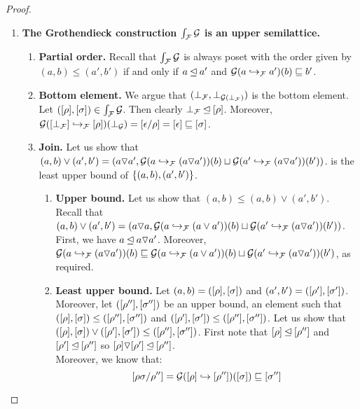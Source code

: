 \begin{proof}
\begin{enumerate}
\item {\bf The Grothendieck construction $\grothy{\ulbF}{\ulbG}$ is an upper semilattice.}
  \begin{enumerate}
  \item {\bf Partial order.}
    Recall that $\grothy{\ulbF}{\ulbG}$ is always poset
    with the order given by $(a,b) \leq (a',b')$ if and only if
    $a \leqF a'$ and $\ulbG(\ptF{a'}{a})(b) \permle b'$.
  \item {\bf Bottom element.}
    We argue that $(\bot_{\ulbF},\bot_{\ulbG(\bot_\ulbF)})$ is the bottom
    element. Let $(\cls{\redseq},\cls{\redseqtwo}) \in \grothy{\ulbF}{\ulbG}$.
    Then clearly $\bot_{\ulbF} \leqF \cls{\redseq}$. Moreover,
    $
     \ulbG(\ptF{[\redseq]}{[\bot_{\ulbF}]})(\bot_\ulbG) =
     [\emptyDerivation/\redseq] = [\emptyDerivation] \permle \cls{\redseqtwo}
    $.
  \item {\bf Join.}
    Let us show that $(a, b) \lor (a',b') = (a \lorF a', \ulbG(\ptF{(a \lorF a')}{a})(b) \sqcup \ulbG(\ptF{(a \lorF a')}{a'})(b'))$.
    is the least upper bound of $\set{(a, b), (a',b')}$.
    \begin{enumerate}
    \item {\bf Upper bound.}
      Let us show that $(a, b) \leq (a, b) \lor (a',b')$.
      Recall that $(a, b) \lor (a', b') = (a \lorF a, \ulbG(\ptF{(a \lor a')}{a})(b) \sqcup \ulbG(\ptF{(a \lorF a')}{a'})(b'))$.
      First, we have $a \leqF a \lorF a'$.
      Moreover, $\ulbG(\ptF{(a \lorF a')}{a})(b) \permle \ulbG(\ptF{(a \lor a')}{a})(b) \sqcup \ulbG(\ptF{(a \lorF a')}{a'})(b')$, as required.
    \item {\bf Least upper bound.}
      Let $(a,b) = (\cls{\redseq},\cls{\redseqtwo})$
      and $(a',b') = (\cls{\redseq'},\cls{\redseqtwo'})$.
      Moreover, let $(\cls{\redseq''},\cls{\redseqtwo''})$ be an upper bound,
      \ie an element
      such that $(\cls{\redseq},\cls{\redseqtwo}) \leq (\cls{\redseq''},\cls{\redseqtwo''})$
      and $(\cls{\redseq'},\cls{\redseqtwo'}) \leq (\cls{\redseq''},\cls{\redseqtwo''})$.
      Let us show that
      $(\cls{\redseq},\cls{\redseqtwo}) \lor (\cls{\redseq'},\cls{\redseqtwo'}) \leq (\cls{\redseq''},\cls{\redseqtwo''})$.
      First note that $\cls{\redseq} \leqF \cls{\redseq''}$ and $\cls{\redseq'} \leqF \cls{\redseq''}$
      so $\cls{\redseq} \lorF \cls{\redseq'} \leqF \cls{\redseq''}$.\\
      Moreover, we know that:
      \[
        \cls{\redseq\redseqtwo/\redseq''} = \ulbG(\pt{\cls{\redseq''}}{\cls{\redseq}})(\cls{\redseqtwo}) \permle \cls{\redseqtwo''}
\]
\end{enumerate}
\end{enumerate}
\end{enumerate}
\end{proof}
